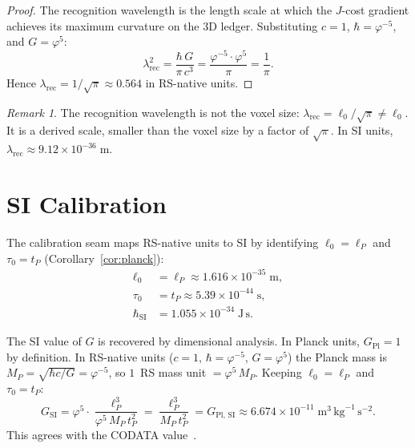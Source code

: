 \documentclass[12pt,a4paper]{article}
\theoremstyle{definition}
\theoremstyle{remark}
\newtheorem{remark}[theorem]{Remark}
\begin{document}
\begin{proof}
The recognition wavelength is the length scale at which the
$J$-cost gradient achieves its maximum curvature on the 3D
ledger.  Substituting $c = 1$, $\hbar = \varphi^{-5}$, and
$G = \varphi^5$:
\begin{equation}
  \lambda_{\mathrm{rec}}^2
  = \frac{\hbar\,G}{\pi\,c^3}
  = \frac{\varphi^{-5} \cdot \varphi^5}{\pi}
  = \frac{1}{\pi}.
\end{equation}
Hence $\lambda_{\mathrm{rec}} = 1/\sqrt{\pi} \approx 0.564$
in RS-native units.
\end{proof}

\begin{remark}
The recognition wavelength is not the voxel size:
$\lambda_{\mathrm{rec}} = \ell_0/\sqrt{\pi} \neq \ell_0$.
It is a derived scale, smaller than the voxel size by a
factor of $\sqrt{\pi}$.  In SI units,
$\lambda_{\mathrm{rec}} \approx 9.12 \times 10^{-36}\;\mathrm{m}$.
\end{remark}

\section{SI Calibration}
\label{sec:si}

The calibration seam maps RS-native units to SI by
identifying $\ell_0 = \ell_P$ and $\tau_0 = t_P$
(Corollary~\ref{cor:planck}):
\begin{align}
  \ell_0 &= \ell_P \approx 1.616 \times 10^{-35}\;\mathrm{m}, \\
  \tau_0 &= t_P \approx 5.39 \times 10^{-44}\;\mathrm{s}, \\
  \hbar_{\mathrm{SI}} &= 1.055 \times 10^{-34}\;\mathrm{J\,s}.
\end{align}

The SI value of $G$ is recovered by dimensional analysis.
In Planck units, $G_{\mathrm{Pl}} = 1$ by definition.  In
RS-native units ($c = 1$, $\hbar = \varphi^{-5}$, $G = \varphi^5$)
the Planck mass is $M_P = \sqrt{\hbar c/G} = \varphi^{-5}$,
so $1$~RS mass unit $= \varphi^5\,M_P$.  Keeping $\ell_0 = \ell_P$
and $\tau_0 = t_P$:
\begin{equation}
  G_{\mathrm{SI}} = \varphi^5 \cdot
  \frac{\ell_P^3}{\varphi^5\,M_P\,t_P^2}
  = \frac{\ell_P^3}{M_P\,t_P^2}
  = G_{\mathrm{Pl,\,SI}}
  \approx 6.674 \times 10^{-11}\;\mathrm{m}^3\,
  \mathrm{kg}^{-1}\,\mathrm{s}^{-2}.
\end{equation}
This agrees with the CODATA value~\cite{CODATA}.
\end{document}
